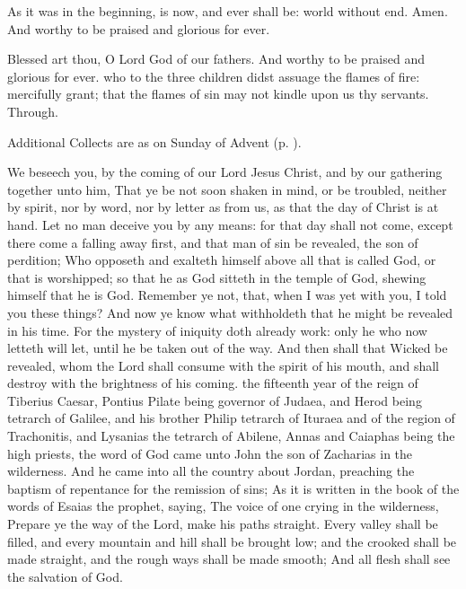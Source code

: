 As it was in the beginning, is now, and ever shall be: world without end. Amen. And worthy to be praised and glorious for ever.

Blessed art thou, O Lord God of our fathers. And worthy to be praised and glorious for ever.
\collect
{} who to the three children didst assuage the flames of fire: mercifully grant; that the flames of sin may not kindle upon us thy servants. Through.
\begin{rubric}
    Additional Collects are as on  Sunday of Advent (p. \pageref{AdventI}).
\end{rubric}
 We beseech you, by the coming of our Lord Jesus Christ, and by our gathering together unto him, That ye be not soon shaken in mind, or be troubled, neither by spirit, nor by word, nor by letter as from us, as that the day of Christ is at hand. Let no man deceive you by any means: for that day shall not come, except there come a falling away first, and that man of sin be revealed, the son of perdition; Who opposeth and exalteth himself above all that is called God, or that is worshipped; so that he as God sitteth in the temple of God, shewing himself that he is God. Remember ye not, that, when I was yet with you, I told you these things? And now ye know what withholdeth that he might be revealed in his time. For the mystery of iniquity doth already work: only he who now letteth will let, until he be taken out of the way. And then shall that Wicked be revealed, whom the Lord shall consume with the spirit of his mouth, and shall destroy with the brightness of his coming.
 the fifteenth year of the reign of Tiberius Caesar, Pontius Pilate being governor of Judaea, and Herod being tetrarch of Galilee, and his brother Philip tetrarch of Ituraea and of the region of Trachonitis, and Lysanias the tetrarch of Abilene, Annas and Caiaphas being the high priests, the word of God came unto John the son of Zacharias in the wilderness. And he came into all the country about Jordan, preaching the baptism of repentance for the remission of sins; As it is written in the book of the words of Esaias the prophet, saying, The voice of one crying in the wilderness, Prepare ye the way of the Lord, make his paths straight. Every valley shall be filled, and every mountain and hill shall be brought low; and the crooked shall be made straight, and the rough ways shall be made smooth; And all flesh shall see the salvation of God.

